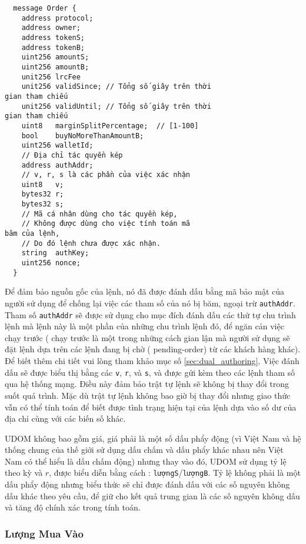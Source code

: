 \documentclass{article}
\begin{document}
\begin{multicols}{2}
\begin{verbatim}
  message Order {
    address protocol;
    address owner;
    address tokenS;
    address tokenB;
    uint256 amountS;
    uint256 amountB;
    unit256 lrcFee
    unit256 validSince; // Tổng số giây trên thời
gian tham chiếu
    unit256 validUntil; // Tổng số giây trên thời 
gian tham chiếu
    uint8   marginSplitPercentage;  // [1-100]
    bool    buyNoMoreThanAmountB;
    uint256 walletId;
    // Địa chỉ tác quyền kép
    address authAddr;
   	// v, r, s là các phần của việc xác nhận
    uint8   v;       
    bytes32 r;
    bytes32 s;
    // Mã cá nhân dùng cho tác quyền kép,
    // Không được dùng cho việc tính toán mã 
băm của lệnh,
    // Do đó lệnh chưa được xác nhận.
    string  authKey;          
    uint256 nonce;
  }
\end{verbatim}


Để đảm bảo nguồn gốc của lệnh, nó đã được đánh dấu bằng mã bảo mật của người sử dụng để chống lại việc các tham số của nó bị băm, ngoại trừ \verb|authAddr|. Tham số \verb|authAddr| sẽ được sử dụng cho mục đích đánh dấu các thứ tự chu trình lệnh mà lệnh này là một phần của những chu trình lệnh đó, để ngăn cản việc chạy trước ( chạy trước là một trong những cách gian lận mà người sử dụng sẽ đặt lệnh dựa trên các lệnh đang bị chờ ( pending-order) từ các khách hàng khác). Để biết thêm chi tiết vui lòng tham khảo mục số \ref{sec:dual_authoring}. Việc đánh dấu sẽ được biểu thị bằng các \verb|v|, \verb|r|, và \verb|s|, và được gửi kèm theo các lệnh tham số qua hệ thống mạng. Điều này đảm bảo trật tự lệnh sẽ không bị thay đổi trong suốt quá trình. Mặc dù trật tự lệnh không bao giờ bị thay đổi nhưng giao thức vẫn có thể tính toán để biết được tình trạng hiện tại của lệnh dựa vào số dư của địa chỉ cùng với các biến số khác.

UDOM không bao gồm giá, giá phải là một số dấu phẩy động (vì Việt Nam và hệ thống chung của thế giới sử dụng dấu chấm và dấu phẩy khác nhau nên Việt Nam có thể hiểu là dấu chấm động) nhưng thay vào đó, UDOM sử dụng tỷ lệ theo kỳ và $r$, được biểu diễn bằng cách : \verb|lượngS|/\verb|lượngB|. Tỷ lệ không phải là một dấu phẩy động nhưng biểu thức sẽ chỉ được đánh dấu với các số nguyên không dấu khác theo yêu cầu, để giữ cho kết quả trung gian là các số nguyên không dấu và tăng độ chính xác trong tính toán. 

\subsubsection{Lượng Mua Vào}


\end{multicols}
\end{document}

